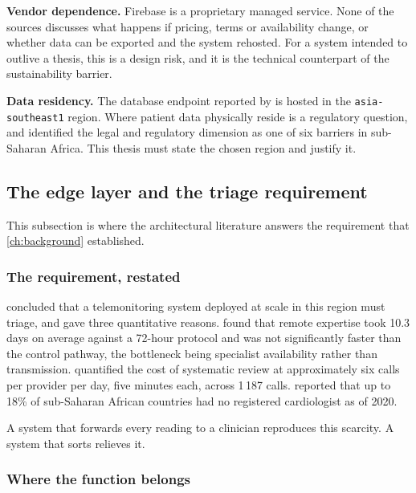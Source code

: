 \documentclass[12pt,a4paper,oneside]{report}
\begin{document}
\textbf{Vendor dependence.} Firebase is a proprietary managed service. None of the sources discusses what happens if pricing, terms or availability change, or whether data can be exported and the system rehosted. For a system intended to outlive a thesis, this is a design risk, and it is the technical counterpart of the sustainability barrier.

\textbf{Data residency.} The database endpoint reported by \textcite{efendi2025} is hosted in the \texttt{asia-southeast1} region. Where patient data physically reside is a regulatory question, and \textcite{dodoo2022} identified the legal and regulatory dimension as one of six barriers in sub-Saharan Africa. This thesis must state the chosen region and justify it.

\subsection{The edge layer and the triage requirement}\label{sec:edge-triage}

This subsection is where the architectural literature answers the requirement that \cref{ch:background} established.

\subsubsection{The requirement, restated}

 concluded that a telemonitoring system deployed at scale in this region must triage, and gave three quantitative reasons. \Textcite{bediang2021} found that remote expertise took 10.3 days on average against a 72-hour protocol and was not significantly faster than the control pathway, the bottleneck being specialist availability rather than transmission. \Textcite{kingue2013} quantified the cost of systematic review at approximately six calls per provider per day, five minutes each, across 1\,187 calls. \Textcite{segun2025} reported that up to 18\% of sub-Saharan African countries had no registered cardiologist as of 2020.

A system that forwards every reading to a clinician reproduces this scarcity. A system that sorts relieves it.

\subsubsection{Where the function belongs}
\end{document}
